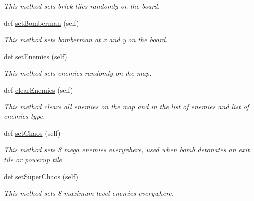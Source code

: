 \begin{DoxyCompactItemize}
\begin{DoxyCompactList}\small\item\em This method sets brick tiles randomly on the board. \end{DoxyCompactList}\item 
\hypertarget{classsrc_1_1level_1_1_level_a76cfaab350e8f7699f054e9e9423de6c}{}def \hyperlink{classsrc_1_1level_1_1_level_a76cfaab350e8f7699f054e9e9423de6c}{set\+Bomberman} (self)\label{classsrc_1_1level_1_1_level_a76cfaab350e8f7699f054e9e9423de6c}

\begin{DoxyCompactList}\small\item\em This method sets bomberman at x and y on the board. \end{DoxyCompactList}\item 
\hypertarget{classsrc_1_1level_1_1_level_af60d85055b9f07935312e581b5316364}{}def \hyperlink{classsrc_1_1level_1_1_level_af60d85055b9f07935312e581b5316364}{set\+Enemies} (self)\label{classsrc_1_1level_1_1_level_af60d85055b9f07935312e581b5316364}

\begin{DoxyCompactList}\small\item\em This method sets enemies randomly on the map. \end{DoxyCompactList}\item 
\hypertarget{classsrc_1_1level_1_1_level_acd226ddc877d5bf1e18c4d2a7e790fb3}{}def \hyperlink{classsrc_1_1level_1_1_level_acd226ddc877d5bf1e18c4d2a7e790fb3}{clear\+Enemies} (self)\label{classsrc_1_1level_1_1_level_acd226ddc877d5bf1e18c4d2a7e790fb3}

\begin{DoxyCompactList}\small\item\em This method clears all enemies on the map and in the list of enemies and list of enemies type. \end{DoxyCompactList}\item 
\hypertarget{classsrc_1_1level_1_1_level_a4b318116c4f5b2bdad46be495e21c53d}{}def \hyperlink{classsrc_1_1level_1_1_level_a4b318116c4f5b2bdad46be495e21c53d}{set\+Chaos} (self)\label{classsrc_1_1level_1_1_level_a4b318116c4f5b2bdad46be495e21c53d}

\begin{DoxyCompactList}\small\item\em This method sets 8 mega enemies everywhere, used when bomb detonates an exit tile or powerup tile. \end{DoxyCompactList}\item 
\hypertarget{classsrc_1_1level_1_1_level_acf03686c3657b7e1a5436bbf1b721bf2}{}def \hyperlink{classsrc_1_1level_1_1_level_acf03686c3657b7e1a5436bbf1b721bf2}{set\+Super\+Chaos} (self)\label{classsrc_1_1level_1_1_level_acf03686c3657b7e1a5436bbf1b721bf2}

\begin{DoxyCompactList}\small\item\em This method sets 8 maximum level enemies everywhere. \end{DoxyCompactList}\end{DoxyCompactItemize}
